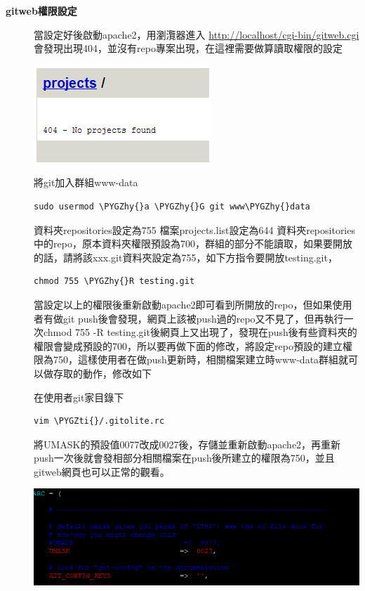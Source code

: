 \documentclass[letterpaper,10pt,english]{sphinxmanual}
\def\PYGZhy{\char`\-}
\def\PYGZti{\char`\~}
\begin{document}
\begin{description}
\item[{\textbf{gitweb權限設定}}] \leavevmode
當設定好後啟動apache2，用瀏灠器進入 \href{http://localhost/cgi-bin/gitweb.cgi}{http://localhost/cgi-bin/gitweb.cgi} 會發現出現404，並沒有repo專案出現，在這裡需要做算讀取權限的設定

\includegraphics{gitolite3-gitweb-2.png}

將git加入群組www-data

\begin{Verbatim}[commandchars=\\\{\}]
sudo usermod \PYGZhy{}a \PYGZhy{}G git www\PYGZhy{}data
\end{Verbatim}

資料夾repositories設定為755
檔案projects.list設定為644
資料夾repositories中的repo，原本資料夾權限預設為700，群組的部分不能讀取，如果要開放的話，請將該xxx.git資料夾設定為755，如下方指令要開放testing.git，

\begin{Verbatim}[commandchars=\\\{\}]
chmod 755 \PYGZhy{}R testing.git
\end{Verbatim}

當設定以上的權限後重新啟動apache2即可看到所開放的repo，但如果使用者有做git push後會發現，網頁上該被push過的repo又不見了，但再執行一次chmod 755 -R testing.git後網頁上又出現了，發現在push後有些資料夾的權限會變成預設的700，所以要再做下面的修改，將設定repo預設的建立權限為750，這樣使用者在做push更新時，相關檔案建立時www-data群組就可以做存取的動作，修改如下

在使用者git家目錄下

\begin{Verbatim}[commandchars=\\\{\}]
vim \PYGZti{}/.gitolite.rc
\end{Verbatim}

將UMASK的預設值0077改成0027後，存儲並重新啟動apache2，再重新push一次後就會發相部分相關檔案在push後所建立的權限為750，並且gitweb網頁也可以正常的觀看。

\includegraphics{gitolite3-gitweb-3.png}

\end{description}
\end{document}
